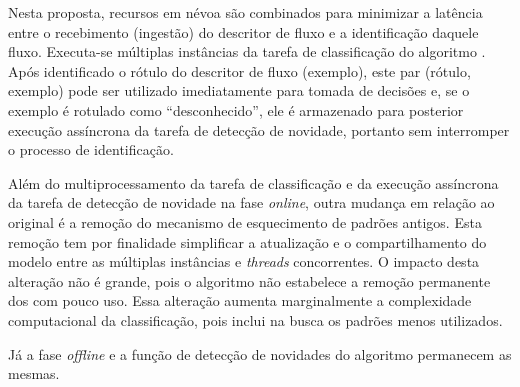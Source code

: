 Nesta proposta, recursos em névoa são combinados para minimizar a latência entre
o recebimento (ingestão) do descritor de fluxo e a identificação daquele fluxo.
Executa-se múltiplas instâncias da tarefa de classificação do algoritmo \minas.
Após identificado o rótulo do descritor de fluxo (exemplo), este par (rótulo, exemplo) pode ser
utilizado imediatamente para tomada de decisões e, se o exemplo é rotulado como
``desconhecido'', ele é armazenado para posterior execução assíncrona da tarefa
de detecção de novidade, portanto sem interromper o processo de identificação.

Além do multiprocessamento da tarefa de classificação e da execução assíncrona da
tarefa de detecção de novidade na fase \emph{online}, outra mudança em relação
ao \minas original é a remoção do mecanismo de esquecimento de padrões antigos.
Esta remoção tem por finalidade simplificar a atualização e o compartilhamento
do modelo entre as múltiplas instâncias e \emph{threads} concorrentes.
% 
O impacto desta alteração não é grande, pois o algoritmo \minas não estabelece a remoção
permanente dos \mclusters com pouco uso. Essa alteração aumenta marginalmente 
a complexidade computacional da classificação, pois inclui na busca  os padrões menos utilizados.

Já a fase \emph{offline} e a função de detecção de novidades do algoritmo \minas
permanecem as mesmas.


